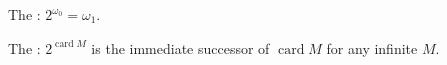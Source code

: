 The : $2^{\omega_0} = \omega_1$.

The : $2^{\operatorname{card} M}$ is the immediate successor of $\operatorname{card} M$ for any infinite $M$.

